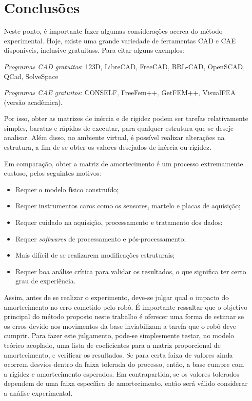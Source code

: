 \chapter{Conclusões}

Neste ponto, é importante fazer algumas considerações acerca do método
experimental.
Hoje, existe uma grande variedade de ferramentas CAD e CAE disponíveis,
inclusive gratuitass. Para citar alguns exemplos:
%
\begin{enumerate*}[label=(\roman*)]
  \item \emph{Programas CAD gratuitos}: 123D, LibreCAD, FreeCAD, BRL-CAD,
  OpenSCAD, QCad, SolveSpace
  \item \emph{Programas CAE gratuitos}: CONSELF, FreeFem++, GetFEM++,
  VisualFEA (versão acadêmica).
\end{enumerate*}
%
Por isso, obter as matrizes de inércia e de rigidez podem ser tarefas
relativamente simples, baratas e rápidas de executar, para qualquer estrutura
que se deseje analisar. Além disso, no ambiente virtual, é possível realizar
alterações na estrutura, a fim de se obter os valores desejados de inércia ou
rigidez.

Em comparação, obter a matriz de amortecimento é um processo extremamente
custoso, pelos seguintes motivos:
%
\begin{itemize}
  \item Requer o modelo físico construído;
  \item Requer instrumentos caros como os sensores, martelo e placas de
  aquisição;
  \item Requer cuidado na aquisição, processamento e tratamento dos dados;
  \item Requer \textit{softwares} de processamento e pós-processamento;
  \item Mais difícil de se realizarem modificações estruturais;
  \item Requer boa análise crítica para validar os resultados, o que significa
  ter certo grau de experiência.
\end{itemize}
%

Assim, antes de se realizar o experimento, deve-se julgar qual o impacto do
amortecimento no erro cometido pelo robô. É importante ressaltar que o objetivo
principal do método proposto neste trabalho é oferecer uma forma de estimar se
os erros devido aos movimentos da base inviabilizam a tarefa que o robô deve
cumprir. Para fazer este julgamento, pode-se simplesmente testar, no modelo
teórico acoplado, uma lista de coeficientes para a matriz proporcional de
amortecimento, e verificar os resultados. Se para certa faixa de valores ainda
ocorrem desvios dentro da faixa tolerada do processo, então, a base cumpre com a
rigidez e amortecimento esperados. Em contrapartida, se os valores tolerados
dependem de uma faixa específica de amortecimento, então será válido considerar
a análise experimental.


